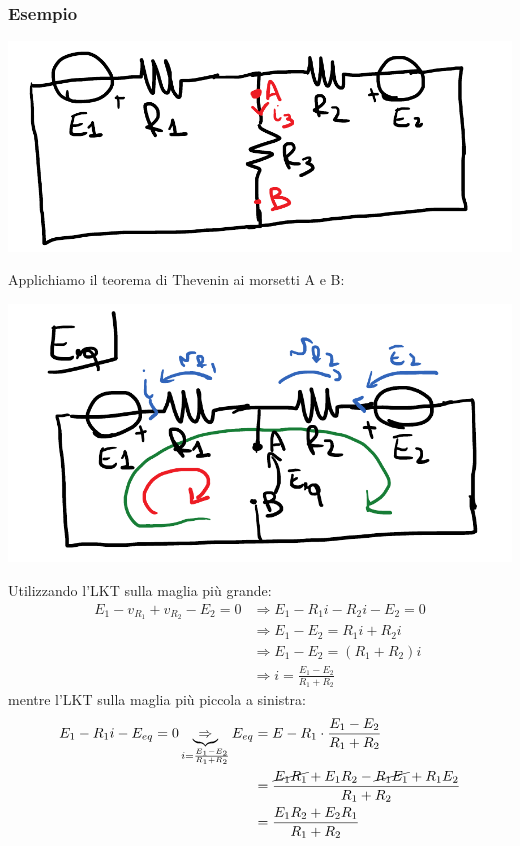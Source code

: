 \documentclass{article}
\begin{document}
\subsubsection{Esempio}
\begin{center}
    \includegraphics[scale=0.27]{Image/Esempio_Thevenin_1.png}
\end{center}
Applichiamo il teorema di Thevenin ai morsetti A e B:
\begin{center}
    \includegraphics[scale=0.3]{Image/Esempio_Thevenin_2.png}
\end{center}
Utilizzando l'LKT sulla maglia più grande:
\begin{align*}
    E_1 - v_{R_1} + v_{R_2} - E_2=0 &\Rightarrow E_1 - R_1i - R_2i - E_2=0\\
    &\Rightarrow E_1 - E_2 = R_1i + R_2 i \\
    & \Rightarrow E_1 - E_2 = (R_1 + R_2)i\\ 
    & \Rightarrow i = \frac{E_1-E_2}{R_1+R_2}
\end{align*}
mentre l'LKT sulla maglia più piccola a sinistra:
\begin{align*}
    E_1 - R_1i -E_{eq}=0 \underbrace{\Rightarrow}_{i=\frac{E_1-E_2}{R_1+R_2}} E_{eq} &= E-R_1 \cdot \frac{E_1-E_2}{R_1+R_2} \\
    &= \frac{\cancel{E_1R_1}+E_1R_2-\cancel{R_1E_1}+R_1E_2}{R_1+R_2}\\
    & = \frac{E_1R_2+E_2R_1}{R_1+R_2}
\end{align*}
\end{document}
